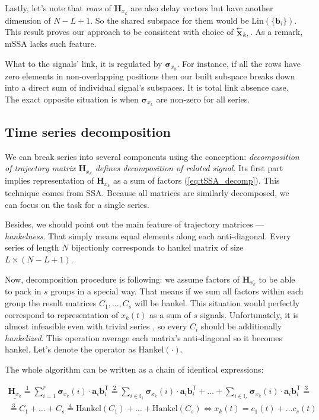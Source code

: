 	Lastly, let's note that \emph{rows} of $ \mathbf{H}_{x_k} $ are also delay vectors but have another dimension of $ N - L + 1 $. So the shared subspace for them would be $ \text{Lin}(\{\mathbf{b}_i\}) $. This result proves our approach to be consistent with choice of $ \overset{\leftarrow}{\mathbf{x}}_{k_t} $. As a remark, mSSA lacks such feature.
	
	What to the signals' link, it is regulated by $ \boldsymbol{\sigma}_{x_k} $. For instance, if all the rows have zero elements in non-overlapping positions then our built subspace breaks down into a direct sum of individual signal's subspaces. It is total link absence case. The exact opposite situation is when $ \boldsymbol{\sigma}_{x_k} $ are non-zero for all series.
	
	\subsection*{Time series decomposition}\label{sec:decomposition}
	
	We can break series into several components using the conception: \emph{decomposition of trajectory matrix $ \mathbf{H}_{x_k} $ defines decomposition of related signal}. Its first part implies representation of $ \mathbf{H}_{x_k} $ as a sum of factors (\ref{eq:tSSA_decomp}). This technique comes from SSA. Because all matrices are similarly decomposed, we can focus on the task for a single series.
	
	Besides, we should point out the main feature of trajectory matrices --- \emph{hankelness}. That simply means equal elements along each anti-diagonal. Every series of length $ N $ bijectionly corresponds to hankel matrix of size $ L \times (N - L + 1) $.
	
	Now, decomposition procedure is following: we assume factors of $ \mathbf{H}_{x_k} $ to be able to pack in $ s $ groups in a special way. That means if we sum all factors within each group the result matrices $ C_1, \ldots, C_s $ will be hankel. This situation would perfectly correspond to representation of $ x_k(t) $ as a sum of $ s $ signals. Unfortunately, it is almost infeasible even with trivial series \cite{ecfb9dc578be43ae9ee8fc88b8ff9151}, so every $ C_i $ should be additionally \emph{hankelized}. This operation average each matrix's anti-diagonal so it becomes hankel. Let's denote the operator as $ \text{Hankel}(\cdot) $. 
	
	The whole algorithm can be written as a chain of identical expressions:
	
	\begin{multline}\label{eq:decomp_method_ideal}
		\underline{\mathbf{H}_{x_k}} \overset{1}{=} \sum\limits_{i = 1}^{r} \boldsymbol{\sigma}_{x_k}(i) \cdot \mathbf{a}_i  \mathbf{b}_i^{\mathsf{T}} \overset{2}{=} \sum\limits_{i \in \mathbb{I}_1} \boldsymbol{\sigma}_{x_k}(i) \cdot \mathbf{a}_i  \mathbf{b}_i^{\mathsf{T}} + \ldots + \sum\limits_{i \in \mathbb{I}_s} \boldsymbol{\sigma}_{x_k}(i) \cdot \mathbf{a}_i  \mathbf{b}_i^{\mathsf{T}} \overset{3}{=} \\ \overset{3}{=} C_1 + \ldots + C_s \overset{4}{=} \underline{\text{Hankel}(C_1) + \ldots + \text{Hankel}(C_s)}  \Leftrightarrow x_k(t) = c_1(t) + \ldots c_s(t)
	\end{multline}
	
